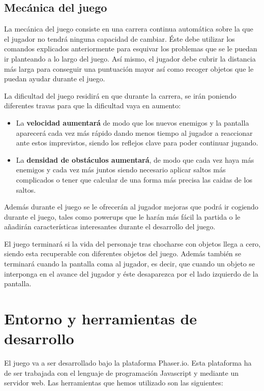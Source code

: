 \documentclass[palatino]{apuntes}
\begin{document}
\subsection{Mecánica del juego}

La mecánica del juego consiste en una carrera continua automática sobre la que el jugador no tendrá ninguna capacidad de cambiar. Éste debe utilizar los comandos explicados anteriormente para esquivar los problemas que se le puedan ir planteando a lo largo del juego. Así mismo, el jugador debe cubrir la distancia más larga para conseguir una puntuación mayor así como recoger objetos que le puedan ayudar durante el juego.

La dificultad del juego residirá en que durante la carrera, se irán poniendo diferentes travas para que la dificultad vaya en aumento:

\begin{itemize}
    \item La \textbf{velocidad aumentará} de modo que los nuevos enemigos y la pantalla aparecerá cada vez más rápido dando menos tiempo al jugador a reaccionar ante estos imprevistos, siendo los reflejos clave para poder continuar jugando.
    \item La \textbf{densidad de obstáculos aumentará}, de modo que cada vez haya más enemigos y cada vez más juntos siendo necesario aplicar saltos más complicados o tener que calcular de una forma más precisa las caidas de los saltos.
\end{itemize}

Además durante el juego se le ofrecerán al jugador mejoras que podrá ir cogiendo durante el juego, tales como powerups que le harán más fácil la partida o le añadirán características interesantes durante el desarrollo del juego.

El juego terminará si la vida del personaje tras chocharse con objetos llega a cero, siendo esta recuperable con diferentes objetos del juego. Además también se terminará cuando la pantalla coma al jugador, es decir, que cuando un objeto se interponga en el avance del jugador y éste desaparezca por el lado izquierdo de la pantalla.


\section {Entorno y herramientas de desarrollo}
El juego va a ser desarrollado bajo la plataforma Phaser.io. Esta plataforma ha de ser trabajada con el lenguaje de programación Javascript y mediante un servidor web. Las herramientas que hemos utilizado son las siguientes:
\end{document}
